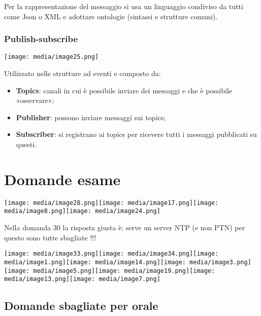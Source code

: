 Per la rappresentazione del messaggio si usa un linguaggio condiviso da
tutti come Json o XML e adottare ontologie (sintassi e strutture
comuni).

\subsubsection{Publish-subscribe}\label{publish-subscribe}

\texttt{[image: media/image25.png]}

Utilizzato nelle strutture ad eventi e composto da:

\begin{itemize}
\item
  \textbf{Topics}: canali in cui è possibile inviare dei messaggi e che
  è possibile «osservare»;
\item
  \textbf{Publisher}: possono inviare messaggi sui topics;
\item
  \textbf{Subscriber}: si registrano ai topics per ricevere tutti i
  messaggi pubblicati su questi.
\end{itemize}

\section{Domande esame}\label{domande-esame}

\texttt{[image: media/image28.png]}\texttt{[image: media/image17.png]}\texttt{[image: media/image8.png]}\texttt{[image: media/image24.png]}

Nella domanda 30 la risposta giusta è: serve un server NTP (e non PTN)
per questo sono tutte sbagliate !!!

\texttt{[image: media/image33.png]}\texttt{[image: media/image34.png]}\texttt{[image: media/image1.png]}\texttt{[image: media/image14.png]}\texttt{[image: media/image3.png]}\texttt{[image: media/image5.png]}\texttt{[image: media/image19.png]}\texttt{[image: media/image13.png]}\texttt{[image: media/image7.png]}

\subsection{Domande sbagliate per
orale}\label{domande-sbagliate-per-orale}

